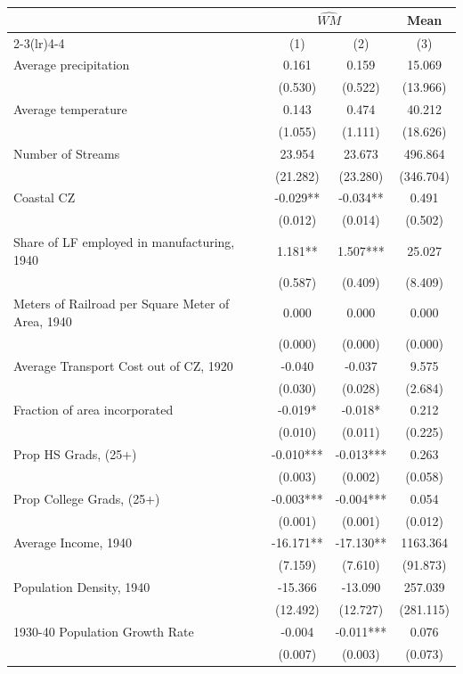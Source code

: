 \begin{tabular}{l*{3}{c}} \toprule
&\multicolumn{2}{c}{$\widehat{WM}$}&\multicolumn{1}{c}{Mean}\\\cmidrule(lr){2-3}\cmidrule(lr){4-4}
&\multicolumn{1}{c}{(1)}&\multicolumn{1}{c}{(2)}&\multicolumn{1}{c}{(3)}\\
\midrule 
Average precipitation  &    0.161 & 0.159 & 15.069 \\
                &  (0.530)  &  (0.522)  &  (13.966)    \\
Average temperature  &    0.143 & 0.474 & 40.212 \\
                &  (1.055)  &  (1.111)  &  (18.626)    \\
Number of Streams  &    23.954 & 23.673 & 496.864 \\
                &  (21.282)  &  (23.280)  &  (346.704)    \\
Coastal CZ  &    -0.029** & -0.034** & 0.491 \\
                &  (0.012)  &  (0.014)  &  (0.502)    \\
Share of LF employed in manufacturing, 1940  &    1.181** & 1.507*** & 25.027 \\
                &  (0.587)  &  (0.409)  &  (8.409)    \\
Meters of Railroad per Square Meter of Area, 1940  &    0.000 & 0.000 & 0.000 \\
                &  (0.000)  &  (0.000)  &  (0.000)    \\
Average Transport Cost out of CZ, 1920  &    -0.040 & -0.037 & 9.575 \\
                &  (0.030)  &  (0.028)  &  (2.684)    \\
Fraction of area incorporated  &    -0.019* & -0.018* & 0.212 \\
                &  (0.010)  &  (0.011)  &  (0.225)    \\
Prop HS Grads, (25+)  &    -0.010*** & -0.013*** & 0.263 \\
                &  (0.003)  &  (0.002)  &  (0.058)    \\
Prop College Grads, (25+)  &    -0.003*** & -0.004*** & 0.054 \\
                &  (0.001)  &  (0.001)  &  (0.012)    \\
Average Income, 1940  &    -16.171** & -17.130** & 1163.364 \\
                &  (7.159)  &  (7.610)  &  (91.873)    \\
Population Density, 1940  &    -15.366 & -13.090 & 257.039 \\
                &  (12.492)  &  (12.727)  &  (281.115)    \\
1930-40 Population Growth Rate  &    -0.004 & -0.011*** & 0.076 \\
                &  (0.007)  &  (0.003)  &  (0.073)    \\
\bottomrule \end{tabular}
